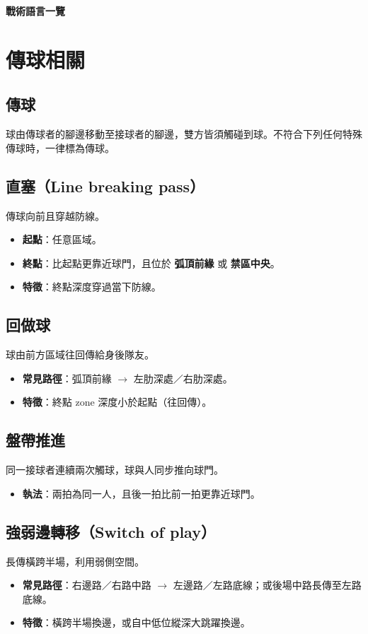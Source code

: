\documentclass[11pt]{article}
\newcommand{\term}[1]{\textbf{#1}}
\begin{document}
{\LARGE\bfseries 戰術語言一覽\par}

\section{傳球相關}

\subsection*{\term{傳球}}
球由傳球者的腳邊移動至接球者的腳邊，雙方皆須觸碰到球。不符合下列任何特殊傳球時，一律標為傳球。

\subsection*{\term{直塞}（Line breaking pass）}
傳球向前且穿越防線。
\begin{itemize}
  \item \textbf{起點}：任意區域。
  \item \textbf{終點}：比起點更靠近球門，且位於 \term{弧頂前緣} 或 \term{禁區中央}。
  \item \textbf{特徵}：終點深度穿過當下防線。
\end{itemize}

\subsection*{\term{回做球}}
球由前方區域往回傳給身後隊友。
\begin{itemize}
  \item \textbf{常見路徑}：弧頂前緣 $\rightarrow$ 左肋深處／右肋深處。
  \item \textbf{特徵}：終點 zone 深度小於起點（往回傳）。
\end{itemize}

\subsection*{\term{盤帶推進}}
同一接球者連續兩次觸球，球與人同步推向球門。
\begin{itemize}
  \item \textbf{執法}：兩拍為同一人，且後一拍比前一拍更靠近球門。
\end{itemize}

\subsection*{\term{強弱邊轉移}（Switch of play）}
長傳橫跨半場，利用弱側空間。
\begin{itemize}
  \item \textbf{常見路徑}：右邊路／右路中路 $\rightarrow$ 左邊路／左路底線；或後場中路長傳至左路底線。
  \item \textbf{特徵}：橫跨半場換邊，或自中低位縱深大跳躍換邊。
\end{itemize}
\end{document}
